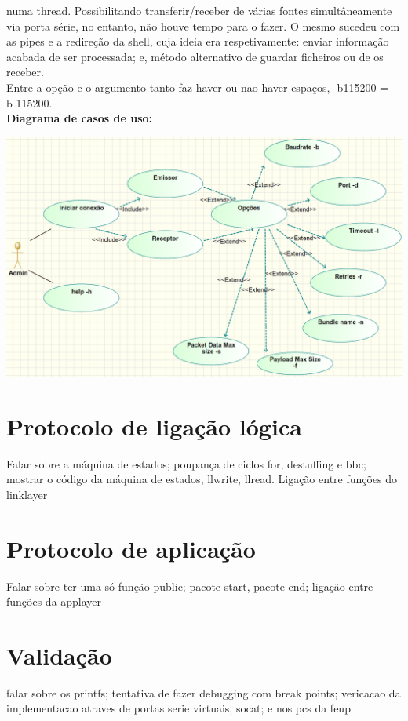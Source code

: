\documentclass[a4paper]{article}
\begin{document}
numa thread. Possibilitando transferir/receber de várias fontes simultâneamente
via porta série, no entanto, não houve tempo para o fazer. O mesmo sucedeu com
as pipes e a redireção da shell, cuja ideia era respetivamente: enviar
informação acabada de ser processada; e, método alternativo de guardar
ficheiros ou de os receber.\\Entre a opção e o argumento tanto faz haver ou nao
haver espaços, -b115200 = -b 115200.
\\\newline\textbf{Diagrama de casos de uso:}\\\newline
\centerline{\includegraphics[scale=0.42]{useCases.png}}

\section{Protocolo de ligação lógica}
Falar sobre a máquina de estados; poupança de ciclos for, destuffing e bbc; mostrar o código da máquina de
estados, llwrite, llread. Ligação entre funções do linklayer

\section{Protocolo de aplicação}
Falar sobre ter uma só função public; pacote start, pacote end; ligação entre
funções da applayer

\section{Validação}
falar sobre os printfs; tentativa de fazer debugging com break points;
vericacao da implementacao atraves de portas serie virtuais, socat; e nos pcs
da feup
\end{document}
